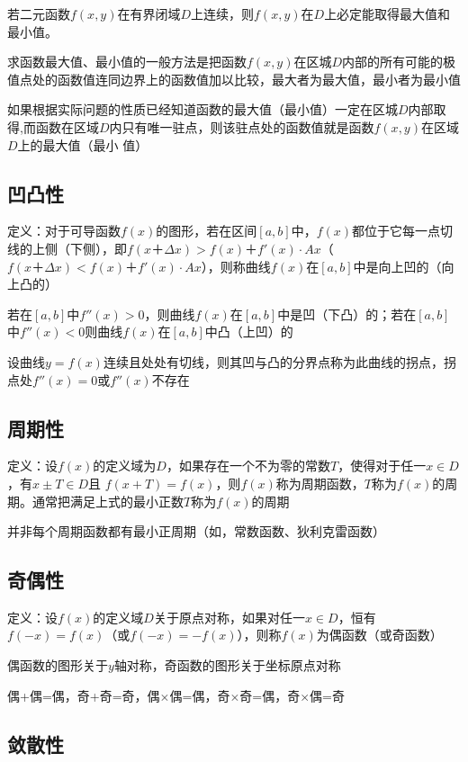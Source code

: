 \documentclass[12pt]{book}
\begin{document}
\par 若二元函数$f(x,y)$在有界闭域$D$上连续，则$f(x,y)$在$D$上必定能取得最大值和最小值。
\par 求函数最大值、最小值的一般方法是把函数$f(x,y)$在区城$D$内部的所有可能的极值点处的函数值连同边界上的函数值加以比较，最大者为最大值，最小者为最小值
\par 如果根据实际问题的性质已经知道函数的最大值（最小值）一定在区城$D$内部取得,而函数在区域$D$内只有唯一驻点，则该驻点处的函数值就是函数$f(x,y)$在区域$D$上的最大值（最小  值）


\subsection{凹凸性}

定义：对于可导函数$f(x)$的图形，若在区间$[a,b]$中，$f(x)$都位于它每一点切线的上侧（下侧），即$ f(x＋\Delta x)>f(x)＋f'(x)\cdot A x$（$ f(x＋\Delta x)<f(x)＋f'(x)\cdot A x$），则称曲线$f(x)$在$[a,b]$中是向上凹的（向上凸的）


若在$[a,b]$中$ f''(x)> 0$，则曲线$f(x)$在$[a,b]$中是凹（下凸）的；若在$[a,b]$中$f''(x)<0$则曲线$f(x)$在$[a,b]$中凸（上凹）的

设曲线$y=f(x)$连续且处处有切线，则其凹与凸的分界点称为此曲线的拐点，拐点处$f''(x)=0$或$f''(x)$不存在

\subsection{周期性}

定义：设$f(x)$的定义域为$D$，如果存在一个不为零的常数$T$，使得对于任一$ x \in D$，有$x\pm T\in D$且 $f(x+T)= f(x)$，则$f(x)$称为周期函数，$T$称为$f(x)$的周期。通常把满足上式的最小正数$T$称为$f(x)$的周期


并非每个周期函数都有最小正周期（如，常数函数、狄利克雷函数）

\subsection{奇偶性}

定义：设$f(x)$的定义域$D$关于原点对称，如果对任一$x\in D$，恒有$f(-x)=f(x)$（或$ f(-x)=- f(x)$），则称$f(x)$为偶函数（或奇函数）


偶函数的图形关于$y$轴对称，奇函数的图形关于坐标原点对称

偶+偶=偶，奇+奇=奇，偶$\times$偶=偶，奇$\times$奇=偶，奇$\times$偶=奇



\subsection{敛散性}
\end{document}
